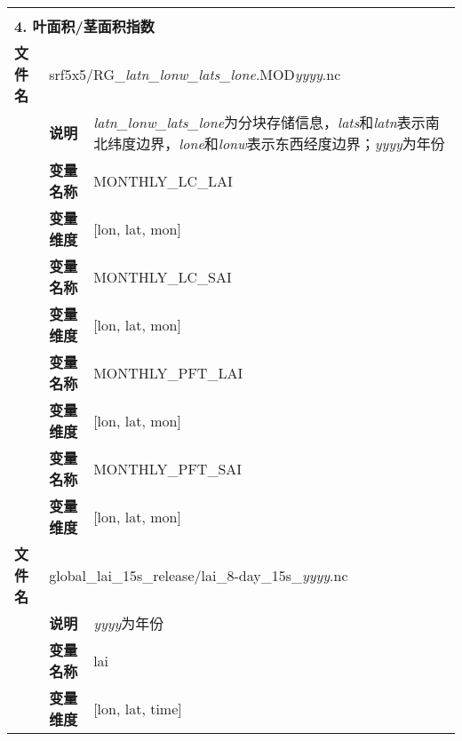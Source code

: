 \documentclass[a4paper,12pt,twoside]{article}
\begin{document}
\begin{longtable}{llp{}}
\midrule
\vspace{2\baselineskip}\\
\multicolumn{3}{l}{\textbf{4. 叶面积/茎面积指数}} \\
\cline{1-3}
\textbf{文件名} & \multicolumn{2}{l}{srf5x5/RG\_\textit{latn\_lonw\_lats\_lone}.MOD\textit{yyyy}.nc} \\
& \textbf{说明} & \textit{latn\_lonw\_lats\_lone}为分块存储信息，\textit{lats}和\textit{latn}表示南北纬度边界，\textit{lone}和\textit{lonw}表示东西经度边界；\textit{yyyy}为年份 \\
\cline{2-3}
& \textbf{变量名称} & MONTHLY\_LC\_LAI \\
& \textbf{变量维度} & {[}lon, lat, mon{]} \\
\cline{2-3}
& \textbf{变量名称} & MONTHLY\_LC\_SAI \\
& \textbf{变量维度} & {[}lon, lat, mon{]} \\
\cline{2-3}
& \textbf{变量名称} & MONTHLY\_PFT\_LAI \\
& \textbf{变量维度} & {[}lon, lat, mon{]} \\
\cline{2-3}
& \textbf{变量名称} & MONTHLY\_PFT\_SAI \\
& \textbf{变量维度} & {[}lon, lat, mon{]} \\
\cline{1-3}
\textbf{文件名} & \multicolumn{2}{l}{global\_lai\_15s\_release/lai\_8-day\_15s\_\textit{yyyy}.nc} \\
& \textbf{说明} & \textit{yyyy}为年份 \\
\cline{2-3}
& \textbf{变量名称} & lai \\
& \textbf{变量维度} & {[}lon, lat, time{]} \\


\end{longtable}
\end{document}
